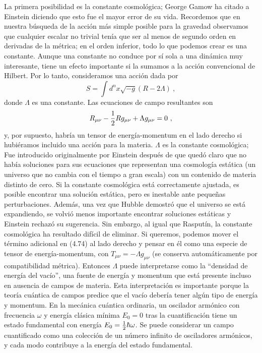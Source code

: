 \documentclass[11pt,b5paper,openany,twoside]{book}
\newcommand{\mn}{{\mu\nu}}
\def\g{{\sqrt{-g}}}
\begin{document}
La primera posibilidad es la constante cosmológica; George Gamow ha citado a Einstein diciendo que esto fue el mayor error de su vida.
Recordemos que en nuestra búsqueda de la acción más simple posible para la gravedad observamos que cualquier escalar no trivial tenía que ser al menos de segundo orden en derivadas de la métrica; en el orden inferior, todo lo que podemos crear es una constante.
Aunque una constante no conduce por sí sola a una dinámica muy interesante, tiene un efecto importante si la sumamos a la acción convencional de Hilbert.
Por lo tanto, consideramos una acción dada por
\begin{equation}
S=\int d^nx \g(R-2\Lambda)\ ,\label{4.73}
\end{equation}
donde $\Lambda$ es una constante.
Las ecuaciones de campo resultantes son
\begin{equation}
R_\mn -{1\over 2}R g_\mn +\Lambda g_\mn =0\ ,\label{4.74}
\end{equation}
y, por supuesto, habría un tensor de energía-momentum en el lado derecho si hubiéramos incluido una acción para la materia.
$\Lambda$ es la constante cosmológica; Fue introducido originalmente por Einstein después de que quedó claro que no había soluciones para sus ecuaciones que representan una cosmología estática (un universo que no cambia con el tiempo a gran escala) con un contenido de materia distinto de cero.
Si la constante cosmológica está correctamente ajustada, es posible encontrar una solución estática, pero es inestable ante pequeñas perturbaciones.
Además, una vez que Hubble demostró que el universo se está expandiendo, se volvió menos importante encontrar soluciones estáticas y Einstein rechazó su sugerencia.
Sin embargo, al igual que Rasputín, la constante cosmológica ha resultado difícil de eliminar.
Si queremos, podemos mover el término adicional en (4.74) al lado derecho y pensar en él como una especie de tensor de energía-momentum, con $T_\mn = - \Lambda g_\mn$ (se conserva automáticamente por compatibilidad métrica).
Entonces $\Lambda$ puede interpretarse como la ``densidad de energía del vacío'', una fuente de energía y momentum que está presente incluso en ausencia de campos de materia.
Esta interpretación es importante porque la teoría cuántica de campos predice que el vacío debería tener algún tipo de energía y momentum.
En la mecánica cuántica ordinaria, un oscilador armónico con frecuencia $\omega$ y energía clásica mínima $E_0=0$ tras la cuantificación tiene un estado fundamental con energía $E_0={1\over 2}\hbar\omega$.
Se puede considerar un campo cuantificado como una colección de un número infinito de osciladores armónicos, y cada modo contribuye a la energía del estado fundamental.
\end{document}
